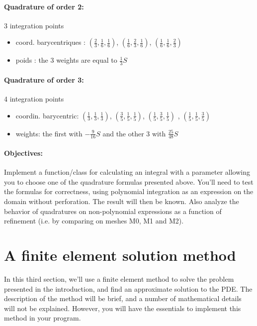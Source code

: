 \documentclass[11pt,a4paper]{article}
\begin{document}
\paragraph{Quadrature of order 2:} 3 integration points
\begin{itemize}
\item coord. barycentriques : $\left(\frac{2}{3},\frac{1}{6},\frac{1}{6}\right)$, $\left(\frac{1}{6},\frac{2}{3},\frac{1}{6}\right)$, $\left(\frac{1}{6},\frac{1}{6},\frac{2}{3}\right)$
\item poids : the 3 weights are equal to $\frac{1}{3} S$
\end{itemize}

\paragraph{Quadrature of order 3:} 4 integration points
\begin{itemize}
\item coordin. barycentric: $\left(\frac{1}{3},\frac{1}{3},\frac{1}{3}\right)$,
  $\left(\frac{3}{5},\frac{1}{5},\frac{1}{5}\right)$,
  $\left(\frac{1}{5},\frac{3}{5},\frac{1}{5}\right)$ ,
  $\left(\frac{1}{5},\frac{1}{5},\frac{3}{5}\right)$
\item weights: the first with $-\frac{9}{16} S$ and the other 3 with $\frac{25}{48} S$
\end{itemize}

\paragraph{Objectives:} Implement a function/class for calculating an integral with a parameter allowing you to choose one of the quadrature formulas presented above.
You'll need to test the formulas for correctness, using polynomial integration as an expression on the domain without perforation. The result will then be known.
Also analyze the behavior of quadratures on non-polynomial expressions as a function of refinement (i.e. by comparing on meshes M0, M1 and M2).



\section{A finite element solution method}

In this third section, we'll use a finite element method to solve the problem presented in the introduction, and find an approximate solution to the PDE.
The description of the method will be brief, and a number of mathematical details will not be explained.
However, you will have the essentials to implement this method in your program.
\end{document}

